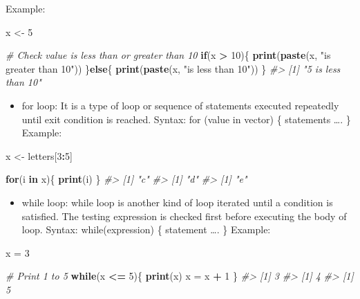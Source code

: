 \documentclass[
]{book}
\newenvironment{Shaded}{\begin{snugshade}}{\end{snugshade}}
\newcommand{\CommentTok}[1]{\textcolor[rgb]{0.56,0.35,0.01}{\textit{#1}}}
\newcommand{\ControlFlowTok}[1]{\textcolor[rgb]{0.13,0.29,0.53}{\textbf{#1}}}
\newcommand{\DecValTok}[1]{\textcolor[rgb]{0.00,0.00,0.81}{#1}}
\newcommand{\FunctionTok}[1]{\textcolor[rgb]{0.13,0.29,0.53}{\textbf{#1}}}
\newcommand{\NormalTok}[1]{#1}
\newcommand{\OtherTok}[1]{\textcolor[rgb]{0.56,0.35,0.01}{#1}}
\newcommand{\SpecialCharTok}[1]{\textcolor[rgb]{0.81,0.36,0.00}{\textbf{#1}}}
\newcommand{\StringTok}[1]{\textcolor[rgb]{0.31,0.60,0.02}{#1}}
\providecommand{\tightlist}{%
  \setlength{\itemsep}{0pt}\setlength{\parskip}{0pt}}
\begin{document}
Example:

\begin{Shaded}
\begin{Highlighting}[]
\NormalTok{x }\OtherTok{\textless{}{-}} \DecValTok{5}

\CommentTok{\# Check value is less than or greater than 10 }
\ControlFlowTok{if}\NormalTok{(x }\SpecialCharTok{\textgreater{}} \DecValTok{10}\NormalTok{)\{ }
  \FunctionTok{print}\NormalTok{(}\FunctionTok{paste}\NormalTok{(x, }\StringTok{"is greater than 10"}\NormalTok{)) }
\NormalTok{\}}\ControlFlowTok{else}\NormalTok{\{ }
  \FunctionTok{print}\NormalTok{(}\FunctionTok{paste}\NormalTok{(x, }\StringTok{"is less than 10"}\NormalTok{)) }
\NormalTok{\}}
\CommentTok{\#\textgreater{} [1] "5 is less than 10"}
\end{Highlighting}
\end{Shaded}

\begin{itemize}
\tightlist
\item
  for loop: It is a type of loop or sequence of statements executed repeatedly until exit condition is reached.
  Syntax:
  for (value in vector) \{
  statements
  \ldots.
  \}
  Example:
\end{itemize}

\begin{Shaded}
\begin{Highlighting}[]
\NormalTok{x }\OtherTok{\textless{}{-}}\NormalTok{ letters[}\DecValTok{3}\SpecialCharTok{:}\DecValTok{5}\NormalTok{] }

\ControlFlowTok{for}\NormalTok{(i }\ControlFlowTok{in}\NormalTok{ x)\{ }
  \FunctionTok{print}\NormalTok{(i) }
\NormalTok{\}}
\CommentTok{\#\textgreater{} [1] "c"}
\CommentTok{\#\textgreater{} [1] "d"}
\CommentTok{\#\textgreater{} [1] "e"}
\end{Highlighting}
\end{Shaded}

\begin{itemize}
\tightlist
\item
  while loop: while loop is another kind of loop iterated until a condition is satisfied. The testing expression is checked first before executing the body of loop.
  Syntax:
  while(expression) \{
  statement
  \ldots.
  \}
  Example:
\end{itemize}

\begin{Shaded}
\begin{Highlighting}[]
\NormalTok{x }\OtherTok{=} \DecValTok{3}

\CommentTok{\# Print 1 to 5 }
\ControlFlowTok{while}\NormalTok{(x }\SpecialCharTok{\textless{}=} \DecValTok{5}\NormalTok{)\{ }
  \FunctionTok{print}\NormalTok{(x) }
\NormalTok{  x }\OtherTok{=}\NormalTok{ x }\SpecialCharTok{+} \DecValTok{1}
\NormalTok{\}}
\CommentTok{\#\textgreater{} [1] 3}
\CommentTok{\#\textgreater{} [1] 4}
\CommentTok{\#\textgreater{} [1] 5}
\end{Highlighting}
\end{Shaded}
\end{document}
